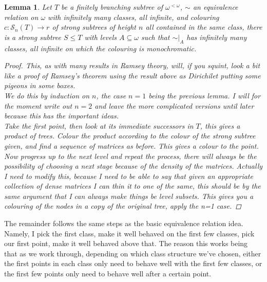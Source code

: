 \documentclass[a4paper,11pt]{article}
\newtheorem{lem}{Lemma}
\begin{document}
\begin{lem}
Let $T$ be a finitely branching subtree of $\omega ^{<\omega}$, $\sim$ an equivalence relation on $\omega$ with infinitely many classes, all infinite, and colouring $c: \mathcal{S}_n(T) \to r$ of strong subtrees of height $n$ all contained in the same class, there is a strong subtree $S\leq T$ with levels $A\subseteq \omega$ such that $\sim |_A$ has infinitely many classes, all infinite on which the colouring is monochromatic.
\begin{proof}
This, as with many results in Ramsey theory, will, if you squint, look a bit like a proof of Ramsey's theorem using the result above as Dirichilet putting some pigeons in some boxes. \\
We do this by induction on $n$, the case $n=1$ being the previous lemma. I will for the moment write out $n=2$ and leave the more complicated versions until later because this has the important ideas. \\
Take the first point, then look at its immediate successors in $T$, this gives a product of trees. Colour the product according to the colour of the strong subtree given, and find a sequence of matrices as before. This gives a colour to the point. Now progress up to the next level and repeat the process, there will always be the possibility of choosing a next stage because of the density of the matrices. Actually I need to modify this, because I need to be able to say that given an appropriate collection of dense matrices I can thin it to one of the same, this should be by the same argument that I can always make things be level subsets. This gives you a colouring of the nodes in a copy of the original tree, apply the n=1 case.
\end{proof}
\end{lem}
The remainder follows the same steps as the basic equivalence relation idea. Namely, I pick the first class, make it well behaved on the first few classes, pick our first point, make it well behaved above that. The reason this works being that as we work through, depending on which class structure we've chosen, either the first points in each class only need to behave well with the first few classes, or the first few points only need to behave well after a certain point.
\end{document}
